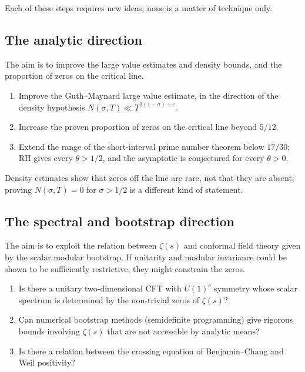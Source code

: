\documentclass[11pt]{amsart}
\theoremstyle{definition}
\theoremstyle{remark}
\begin{document}
Each of these steps requires new ideas; none is a matter of technique only.

\subsection{The analytic direction}\label{sec:path-analytic}

The aim is to improve the large value estimates and density bounds, and the proportion of zeros on the critical line.

\begin{enumerate}[label=(\roman*)]
\item Improve the Guth--Maynard large value estimate, in the direction of the density hypothesis $N(\sigma, T) \ll T^{2(1-\sigma) + \varepsilon}$.
\item Increase the proven proportion of zeros on the critical line beyond $5/12$.
\item Extend the range of the short-interval prime number theorem below $17/30$; RH gives every $\theta>1/2$, and the asymptotic is conjectured for every $\theta>0$.
\end{enumerate}

Density estimates show that zeros off the line are rare, not that they are absent; proving $N(\sigma, T) = 0$ for $\sigma > 1/2$ is a different kind of statement.

\subsection{The spectral and bootstrap direction}\label{sec:path-spectral}

The aim is to exploit the relation between $\zeta(s)$ and conformal field theory given by the scalar modular bootstrap. If unitarity and modular invariance could be shown to be sufficiently restrictive, they might constrain the zeros.

\begin{enumerate}[label=(\roman*)]
\item Is there a unitary two-dimensional CFT with $U(1)^c$ symmetry whose scalar spectrum is determined by the non-trivial zeros of $\zeta(s)$?
\item Can numerical bootstrap methods (semidefinite programming) give rigorous bounds involving $\zeta(s)$ that are not accessible by analytic means?
\item Is there a relation between the crossing equation of Benjamin--Chang and Weil positivity?
\end{enumerate}
\end{document}
